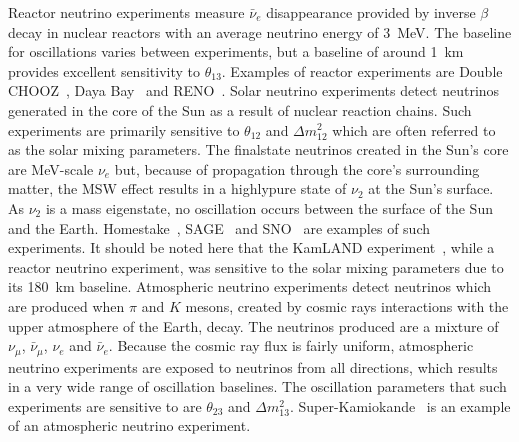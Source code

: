 \newline
\newline
Reactor neutrino experiments measure $\bar{\nu}_e$ disappearance provided by inverse $\beta$ decay in nuclear reactors with an average neutrino energy of 3~MeV.  The baseline for oscillations varies between experiments, but a baseline of around 1~km provides excellent sensitivity to $\theta_{13}$. Examples of reactor experiments are Double CHOOZ~\cite{Abe201366}, Daya Bay~\cite{PhysRevLett.108.171803} and RENO~\cite{PhysRevLett.108.191802}.
\newline
\newline
Solar neutrino experiments detect neutrinos generated in the core of the Sun as a result of nuclear  reaction chains.  Such experiments are primarily sensitive to $\theta_{12}$ and $\Delta m^{2}_{12}$ which are often referred to as the solar mixing parameters.  The finalstate neutrinos created in the Sun's core are MeV-scale $\nu_e$ but, because of propagation through the core's surrounding matter, the MSW effect results in a highlypure state of $\nu_2$ at the Sun's surface.  As $\nu_2$ is a mass eigenstate, no oscillation occurs between the surface of the Sun and the Earth.  Homestake~\cite{0004-637X-496-1-505}, SAGE~\cite{PhysRevC.80.015807} and SNO~\cite{PhysRevLett.87.071301} are examples of such experiments.  It should be noted here that the KamLAND experiment~\cite{PhysRevLett.90.021802}, while a reactor neutrino experiment, was sensitive to the solar mixing parameters due to its 180~km baseline.
\newline
\newline
Atmospheric neutrino experiments detect neutrinos which are produced when $\pi$ and $K$ mesons, created by cosmic rays interactions with the upper atmosphere of the Earth, decay.  The neutrinos produced are a mixture of $\nu_\mu$, $\bar{\nu}_\mu$, $\nu_e$ and $\bar{\nu}_e$.  Because the cosmic ray flux is fairly uniform, atmospheric neutrino experiments are exposed to neutrinos from all directions, which results in a very wide range of oscillation baselines.  The oscillation parameters that such experiments are sensitive to are $\theta_{23}$ and $\Delta m^2_{13}$. Super-Kamiokande~\cite{PhysRevLett.81.1562} is an example of an atmospheric neutrino experiment. 
\newline
\newline
